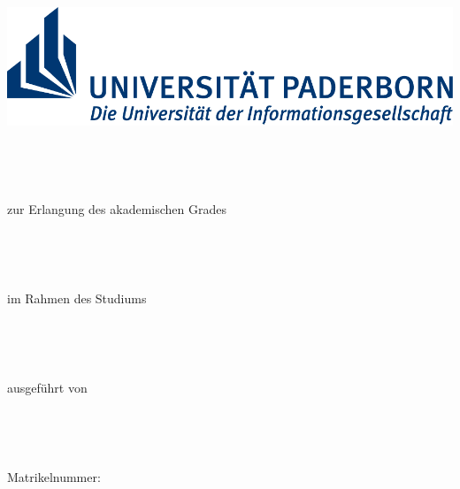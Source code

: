 \begin{titlepage}
\selectfont

\vspace*{-0.75cm}

\begin{minipage}[t]{0.3\linewidth}
\begin{flushleft}
\begin{center}
 \includegraphics[scale=0.75]{images/Logo_Uni_Paderborn.pdf}
\end{center}

\end{flushleft}
\end{minipage}

\vspace{1.0cm}

\begin{center}
\dmseries\huge{\thesistitle \\ \thesissubtitle}
\end{center}

\vspace{0.5cm}

\renewcommand{\bigskip}{\vspace*{0.43cm}}

\begin{center}
\begin{Large}\thesistype \end{Large} \bigskip \\
\begin{normalsize}zur Erlangung des akademischen Grades \end{normalsize} \bigskip \\
\begin{Large}\dmseries\zuerlangendertitel\end{Large} \bigskip \\
\begin{normalsize}im Rahmen des Studiums\end{normalsize} \bigskip \\
\begin{large}\dmseries\studium\end{large} \bigskip \\
\begin{normalsize}ausgef\"{u}hrt von \end{normalsize} \bigskip \\
\begin{large}\dmseries\thesisauthor\end{large} \\
\begin{normalsize}Matrikelnummer: \matrikelnr\end{normalsize} \\
\end{center}


\end{titlepage}
